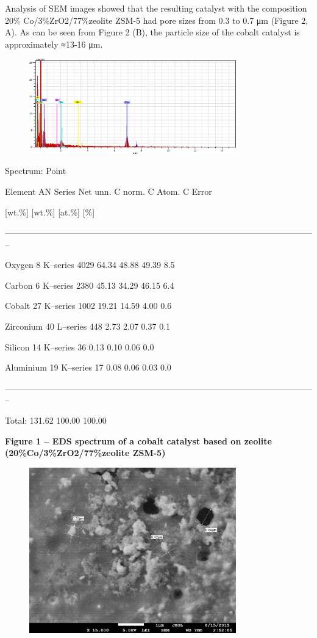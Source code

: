 Analysis of SEM images showed that the resulting catalyst with the
composition 20\% Co/3\%ZrO2/77\%zeolite ZSM-5 had pore sizes from 0.3 to
0.7 μm (Figure 2, A). As can be seen from Figure 2 (B), the particle
size of the cobalt catalyst is approximately ≈13-16 μm.

\begin{figure}[H]
	\centering
	\includegraphics[width=0.8\textwidth]{assets/1076}
	\caption*{}
\end{figure}

Spectrum: Point

Element AN Series Net unn. C norm. C Atom. C Error

{[}wt.\%{]} {[}wt.\%{]} {[}at.\%{]} {[}\%{]}

--------------------------------------------------------------------------------------------------------------

Oxygen 8 K--series 4029 64.34 48.88 49.39 8.5

Carbon 6 K--series 2380 45.13 34.29 46.15 6.4

Cobalt 27 K--series 1002 19.21 14.59 4.00 0.6

Zirconium 40 L--series 448 2.73 2.07 0.37 0.1

Silicon 14 K--series 36 0.13 0.10 0.06 0.0

Aluminium 19 K--series 17 0.08 0.06 0.03 0.0

--------------------------------------------------------------------------------------------------------------

Total: 131.62 100.00 100.00

\textbf{Figure 1 -- EDS spectrum of a cobalt catalyst based on zeolite
(20\%Co/3\%ZrO2/77\%zeolite ZSM-5)}

\begin{figure}[H]
	\centering
	\includegraphics[width=0.8\textwidth]{assets/1077}
	\caption*{}
\end{figure}

